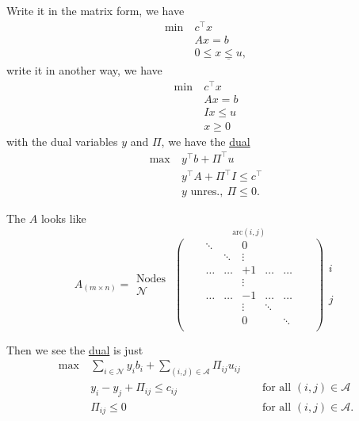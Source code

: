 \begin{answer}
	Write it in the matrix form, we have
	\begin{align*}
		\min~ & c^{\top}x                  \\
		      & Ax = b                     \\
		      & 0\leq \underline{x\leq u},
	\end{align*}
	write it in another way, we have
	\begin{align*}
		\min~ & c^{\top}x \\
		      & Ax = b    \\
		      & Ix\leq u  \\
		      & x\geq 0
	\end{align*}
	with the dual variables \(y\) and \(\Pi\), we have the \hyperref[def:dual]{dual}
	\begin{align*}
		\max~ & y^{\top}b + \Pi^{\top}u            \\
		      & y^{\top}A+\Pi^{\top}I\leq c^{\top} \\
		      & y\text{ unres.},\ \Pi\leq 0.
	\end{align*}

	The \(A\) looks like
	\[
		A_{(m\times n)} = \substack{\text{Nodes }\\\mathcal{N}}\overset{\mathrm{arc}(i, j)}{
			\begin{pmatrix}
				 &  & \ddots &        & 0      &        &        &  & \\
				 &  &        & \ddots & \vdots &        &        &  & \\
				 &  & \ldots & \ldots & +1     & \ldots & \ldots &  & \\
				 &  &        &        & \vdots &        &        &  & \\
				 &  & \ldots & \ldots & -1     & \ldots & \ldots &  & \\
				 &  &        &        & \vdots & \ddots &        &  & \\
				 &  &        &        & 0      &        & \ddots &  & \\
			\end{pmatrix}}\substack{i\\ \\ \\ \\ \\ j}
	\]

	Then we see the \hyperref[def:dual]{dual} is just
	\[
		\begin{alignedat}{3}
			\max~ & \sum\limits_{i\in\mathcal{N}}y_{i}b_{i}+\sum\limits_{(i, j)\in\mathcal{A}} \Pi_{ij}u_{ij}                                        \\
			& y_{i} - y_{j}+\Pi_{ij}\leq c_{ij}                                                         && \text{ for all }(i, j)\in\mathcal{A} \\
			& \Pi_{ij}\leq 0                                                                            && \text{ for all }(i, j)\in\mathcal{A}.
		\end{alignedat}
	\]
\end{answer}